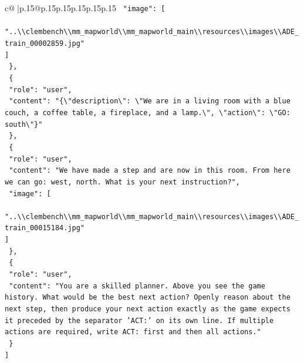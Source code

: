 \documentclass{article}
\begin{document}
{\begin{supertabular}{c@{$\;$}|p{.15\linewidth}@{}p{.15\linewidth}p{.15\linewidth}p{.15\linewidth}p{.15\linewidth}p{.15\linewidth}}
{{{\texttt{    "image": {[}} \\
\texttt{      "..\textbackslash{}\textbackslash{}clembench\textbackslash{}\textbackslash{}mm\_mapworld\textbackslash{}\textbackslash{}mm\_mapworld\_main\textbackslash{}\textbackslash{}resources\textbackslash{}\textbackslash{}images\textbackslash{}\textbackslash{}ADE\_train\_00002859.jpg"} \\
\texttt{    {]}} \\
\texttt{  \},} \\
\texttt{  \{} \\
\texttt{    "role": "user",} \\
\texttt{    "content": "\{\textbackslash{}"description\textbackslash{}": \textbackslash{}"We are in a living room with a blue couch, a coffee table, a fireplace, and a lamp.\textbackslash{}", \textbackslash{}"action\textbackslash{}": \textbackslash{}"GO: south\textbackslash{}"\}"} \\
\texttt{  \},} \\
\texttt{  \{} \\
\texttt{    "role": "user",} \\
\texttt{    "content": "We have made a step and are now in this room. From here we can go: west, north. What is your next instruction?",} \\
\texttt{    "image": {[}} \\
\texttt{      "..\textbackslash{}\textbackslash{}clembench\textbackslash{}\textbackslash{}mm\_mapworld\textbackslash{}\textbackslash{}mm\_mapworld\_main\textbackslash{}\textbackslash{}resources\textbackslash{}\textbackslash{}images\textbackslash{}\textbackslash{}ADE\_train\_00015184.jpg"} \\
\texttt{    {]}} \\
\texttt{  \},} \\
\texttt{  \{} \\
\texttt{    "role": "user",} \\
\texttt{    "content": "You are a skilled planner. Above you see the game history. What would be the best next action? Openly reason about the next step, then produce your next action exactly as the game expects it preceded by the separator 'ACT:' on its own line. If multiple actions are required, write ACT: first and then all actions."} \\
\texttt{  \}} \\
\texttt{{]}} \\
            }
        }
    }
     \\ \\


\end{supertabular}}
\end{document}
